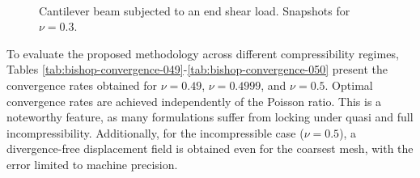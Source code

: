\documentclass[english,11pt,3p,number,sort&compress]{elsarticle}
\begin{document}
\begin{figure}[H]
    \centering
     \hfill
     \\
     \hfill
    \caption{Cantilever beam subjected to an end shear load. Snapshots for $\nu=0.3$.}
    \label{fig:bishop-snapshot}
\end{figure}

To evaluate the proposed methodology across different compressibility regimes, Tables \ref{tab:bishop-convergence-049}-\ref{tab:bishop-convergence-050} present the convergence rates obtained for $\nu=0.49$, $\nu=0.4999$, and $\nu=0.5$. Optimal convergence rates are achieved independently of the Poisson ratio. This is a noteworthy feature, as many formulations suffer from locking under quasi and full incompressibility. Additionally, for the incompressible case ($\nu=0.5$), a divergence-free displacement field is obtained even for the coarsest mesh, with the error limited to machine precision.
\end{document}
